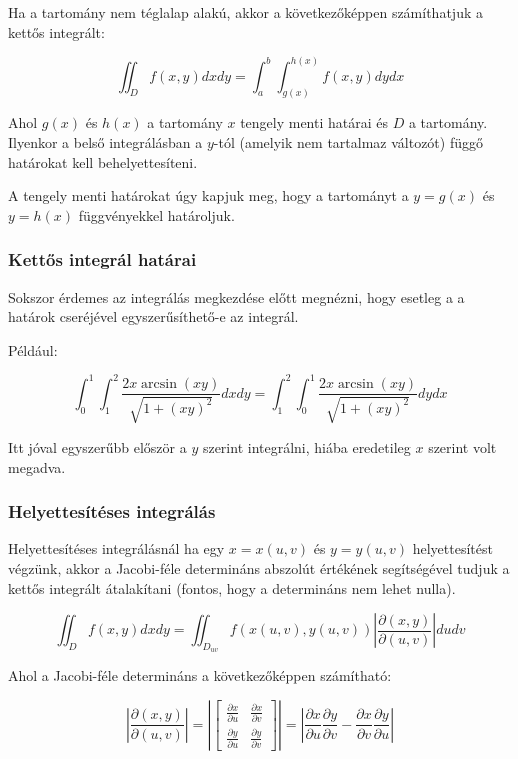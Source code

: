 \documentclass{article}
\begin{document}
Ha a tartomány nem téglalap alakú, akkor a következőképpen számíthatjuk a kettős integrált:

\begin{equation*}
    \iint_{D} f(x,y) dx dy = \int_{a}^{b} \int_{g(x)}^{h(x)} f(x,y) dy dx
\end{equation*}

Ahol $g(x)$ és $h(x)$ a tartomány $x$ tengely menti határai és $D$ a tartomány. Ilyenkor a belső integrálásban a $y$-tól (amelyik nem tartalmaz változót) függő határokat kell behelyettesíteni.

A tengely menti határokat úgy kapjuk meg, hogy a tartományt a $y = g(x)$ és $y = h(x)$ függvényekkel határoljuk.

\subsubsection{Kettős integrál határai}

Sokszor érdemes az integrálás megkezdése előtt megnézni, hogy esetleg a a határok cseréjével egyszerűsíthető-e az integrál.

Például:

\begin{equation*}
    \int_{0}^{1} \int_{1}^{2} \frac{2x\arcsin(xy)}{\sqrt{1+ {(xy)}^2}} dx dy =\int_{1}^{2} \int_{0}^{1} \frac{2x\arcsin(xy)}{\sqrt{1+ {(xy)}^2}} dy dx 
\end{equation*}

Itt jóval egyszerűbb először a $y$ szerint integrálni, hiába eredetileg $x$ szerint volt megadva.

\subsubsection{Helyettesítéses integrálás}

Helyettesítéses integrálásnál ha egy $x=x(u,v)$ és $y=y(u,v)$ 
helyettesítést végzünk, akkor a Jacobi-féle determináns abszolút értékének segítségével tudjuk a kettős integrált átalakítani
 (fontos, hogy a determináns nem lehet nulla).

\begin{equation*}
    \iint_{D} f(x,y) dx dy = \iint_{D_{uv}} f(x(u,v), y(u,v)) \left| \frac{\partial(x,y)}{\partial(u,v)} \right| du dv
\end{equation*}

Ahol a Jacobi-féle determináns a következőképpen számítható:

\begin{equation*}
    \left| \frac{\partial(x,y)}{\partial(u,v)} \right| = \left| \begin{bmatrix} \frac{\partial x}{\partial u} & \frac{\partial x}{\partial v} \\ \frac{\partial y}{\partial u} & \frac{\partial y}{\partial v} \end{bmatrix} \right| = \left| \frac{\partial x}{\partial u} \frac{\partial y}{\partial v} - \frac{\partial x}{\partial v} \frac{\partial y}{\partial u} \right|
\end{equation*}
\end{document}
